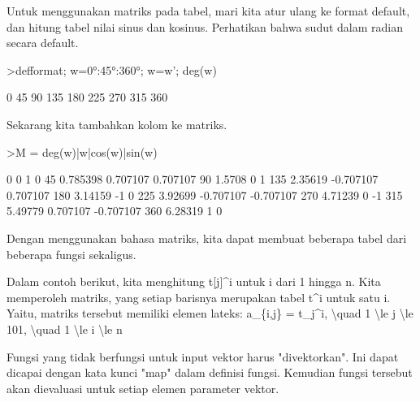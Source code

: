 \documentclass[a4paper,10pt]{article}
\begin{document}
\begin{eulernotebook}
\begin{eulercomment}
\begin{eulercomment}
\begin{eulercomment}
\begin{eulercomment}
\begin{eulercomment}
\begin{eulercomment}
\begin{eulercomment}
Untuk menggunakan matriks pada tabel, mari kita atur ulang ke format
default, dan hitung tabel nilai sinus dan kosinus. Perhatikan bahwa
sudut dalam radian secara default.
\end{eulercomment}
\begin{eulerprompt}
>defformat; w=0°:45°:360°; w=w'; deg(w)
\end{eulerprompt}
\begin{euleroutput}
              0 
             45 
             90 
            135 
            180 
            225 
            270 
            315 
            360 
\end{euleroutput}
\begin{eulercomment}
Sekarang kita tambahkan kolom ke matriks.
\end{eulercomment}
\begin{eulerprompt}
>M = deg(w)|w|cos(w)|sin(w)
\end{eulerprompt}
\begin{euleroutput}
              0             0             1             0 
             45      0.785398      0.707107      0.707107 
             90        1.5708             0             1 
            135       2.35619     -0.707107      0.707107 
            180       3.14159            -1             0 
            225       3.92699     -0.707107     -0.707107 
            270       4.71239             0            -1 
            315       5.49779      0.707107     -0.707107 
            360       6.28319             1             0 
\end{euleroutput}
\begin{eulercomment}
Dengan menggunakan bahasa matriks, kita dapat membuat beberapa tabel
dari beberapa fungsi sekaligus.

Dalam contoh berikut, kita menghitung t[j]\textasciicircum{}i untuk i dari 1 hingga n.
Kita memperoleh matriks, yang setiap barisnya merupakan tabel t\textasciicircum{}i
untuk satu i. Yaitu, matriks tersebut memiliki elemen lateks: a\_\{i,j\}
= t\_j\textasciicircum{}i, \textbackslash{}quad 1 \textbackslash{}le j \textbackslash{}le 101, \textbackslash{}quad 1 \textbackslash{}le i \textbackslash{}le n

Fungsi yang tidak berfungsi untuk input vektor harus "divektorkan".
Ini dapat dicapai dengan kata kunci "map" dalam definisi fungsi.
Kemudian fungsi tersebut akan dievaluasi untuk setiap elemen parameter
vektor.


\end{eulercomment}
\end{eulercomment}
\end{eulercomment}
\end{eulercomment}
\end{eulercomment}
\end{eulercomment}
\end{eulercomment}
\end{eulernotebook}
\end{document}
